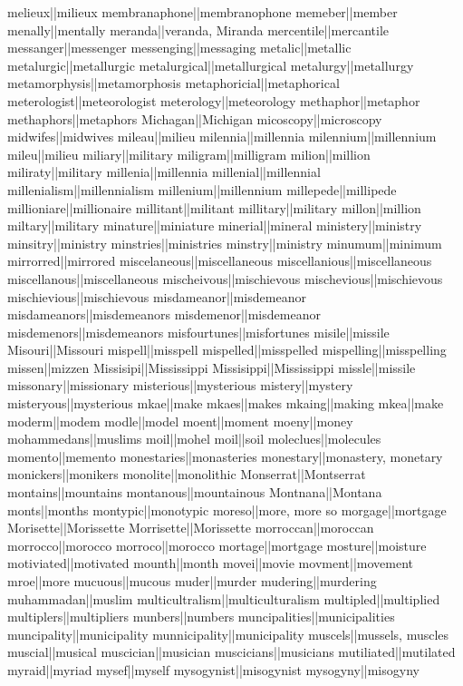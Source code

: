melieux||milieux
membranaphone||membranophone
memeber||member
menally||mentally
meranda||veranda, Miranda
mercentile||mercantile
messanger||messenger
messenging||messaging
metalic||metallic
metalurgic||metallurgic
metalurgical||metallurgical
metalurgy||metallurgy
metamorphysis||metamorphosis
metaphoricial||metaphorical
meterologist||meteorologist
meterology||meteorology
methaphor||metaphor
methaphors||metaphors
Michagan||Michigan
micoscopy||microscopy
midwifes||midwives
mileau||milieu
milennia||millennia
milennium||millennium
mileu||milieu
miliary||military
miligram||milligram
milion||million
miliraty||military
millenia||millennia
millenial||millennial
millenialism||millennialism
millenium||millennium
millepede||millipede
millioniare||millionaire
millitant||militant
millitary||military
millon||million
miltary||military
minature||miniature
minerial||mineral
ministery||ministry
minsitry||ministry
minstries||ministries
minstry||ministry
minumum||minimum
mirrorred||mirrored
miscelaneous||miscellaneous
miscellanious||miscellaneous
miscellanous||miscellaneous
mischeivous||mischievous
mischevious||mischievous
mischievious||mischievous
misdameanor||misdemeanor
misdameanors||misdemeanors
misdemenor||misdemeanor
misdemenors||misdemeanors
misfourtunes||misfortunes
misile||missile
Misouri||Missouri
mispell||misspell
mispelled||misspelled
mispelling||misspelling
missen||mizzen
Missisipi||Mississippi
Missisippi||Mississippi
missle||missile
missonary||missionary
misterious||mysterious
mistery||mystery
misteryous||mysterious
mkae||make
mkaes||makes
mkaing||making
mkea||make
moderm||modem
modle||model
moent||moment
moeny||money
mohammedans||muslims
moil||mohel
moil||soil
moleclues||molecules
momento||memento
monestaries||monasteries
monestary||monastery, monetary
monickers||monikers
monolite||monolithic
Monserrat||Montserrat
montains||mountains
montanous||mountainous
Montnana||Montana
monts||months
montypic||monotypic
moreso||more, more so
morgage||mortgage
Morisette||Morissette
Morrisette||Morissette
morroccan||moroccan
morrocco||morocco
morroco||morocco
mortage||mortgage
mosture||moisture
motiviated||motivated
mounth||month
movei||movie
movment||movement
mroe||more
mucuous||mucous
muder||murder
mudering||murdering
muhammadan||muslim
multicultralism||multiculturalism
multipled||multiplied
multiplers||multipliers
munbers||numbers
muncipalities||municipalities
muncipality||municipality
munnicipality||municipality
muscels||mussels, muscles
muscial||musical
muscician||musician
muscicians||musicians
mutiliated||mutilated
myraid||myriad
mysef||myself
mysogynist||misogynist
mysogyny||misogyny
